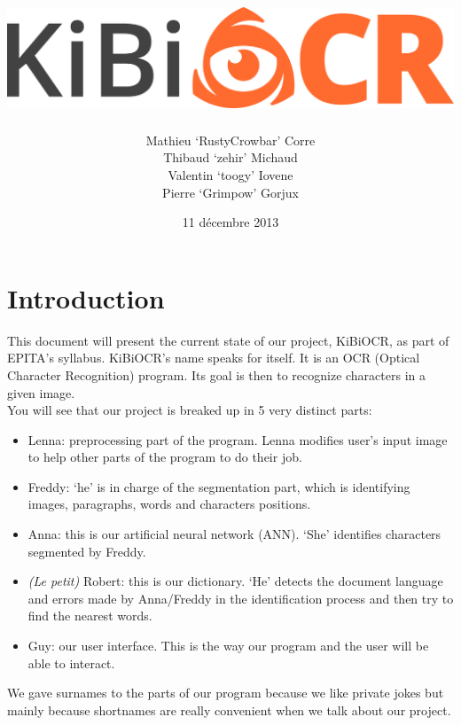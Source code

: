 \documentclass[12pt]{report}
\title{\includegraphics[scale=0.55]{chapters/Pictures/kibi.png}}
\author{Mathieu `RustyCrowbar' Corre \\
        Thibaud `zehir' Michaud \\
        Valentin `toogy' Iovene \\
        Pierre `Grimpow' Gorjux
      }
\date{11 décembre 2013}
\begin{document}
\maketitle

\tableofcontents

\chapter*{Introduction}

This document will present the current state of our project, KiBiOCR, as part of
EPITA's syllabus. KiBiOCR's name speaks for itself. It is an OCR (Optical
Character Recognition) program. Its goal is then to recognize characters in a
given image.\\

You will see that our project is breaked up in 5 very distinct parts:

\begin{itemize}
    \item{Lenna}: preprocessing part of the program. Lenna modifies user's input
        image to help other parts of the program to do their job.
    \item{Freddy}: `he' is in charge of the segmentation part, which is
        identifying images, paragraphs, words and characters positions.
    \item{Anna}: this is our artificial neural network (ANN). `She' identifies
        characters segmented by Freddy.
    \item{\emph{(Le petit)} Robert}: this is our dictionary. `He' detects the
        document language and errors made by Anna/Freddy in the identification
        process and then try to find the nearest words.
    \item{Guy}: our user interface. This is the way our program and the user
        will be able to interact.
\end{itemize}

We gave surnames to the parts of our program because we like private jokes but
mainly because shortnames are really convenient when we talk about our project.

% 
% 
\end{document}
